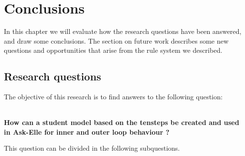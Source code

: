 \chapter{Conclusions}

In this chapter we will evaluate how the research questions have been answered, and draw some conclusions.
The section on future work describes some new questions and opportunities that arise from the rule system we described.
 



\section{Research questions}\label{sec:questions}

The objective of this research is to find answers to the following question:

\begin{center}
\textbf{\\How can a student model based on the \gls{tensteps} be created and used in Ask-Elle for inner and outer loop behaviour ?}
\end{center}

This question can be divided in the following subquestions.

